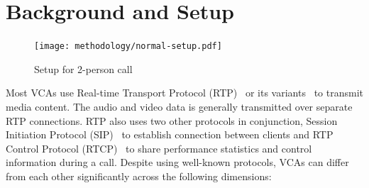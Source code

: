 \section{Background and Setup}

\begin{figure}[h]
\centering
\texttt{[image: methodology/normal-setup.pdf]}
\caption{Setup for 2-person call}
\label{fig:static_setup}
\end{figure}


\label{sec:background}
Most VCAs use Real-time Transport Protocol (RTP)~\cite{schulzrinne1996rtp, schulzrinne2003rfc3550} or its variants~\cite{baugher2004secure, zoom_rtp} to transmit media content. The audio and video data is generally transmitted over separate RTP connections. RTP also uses two other protocols in conjunction, Session Initiation Protocol (SIP)~\cite{rosenberg2002sip} to establish connection between clients and RTP Control Protocol (RTCP)~\cite{schulzrinne2003rfc3550} to share performance statistics and control information during a call. Despite using well-known protocols, VCAs can differ from each other significantly across the following dimensions:


